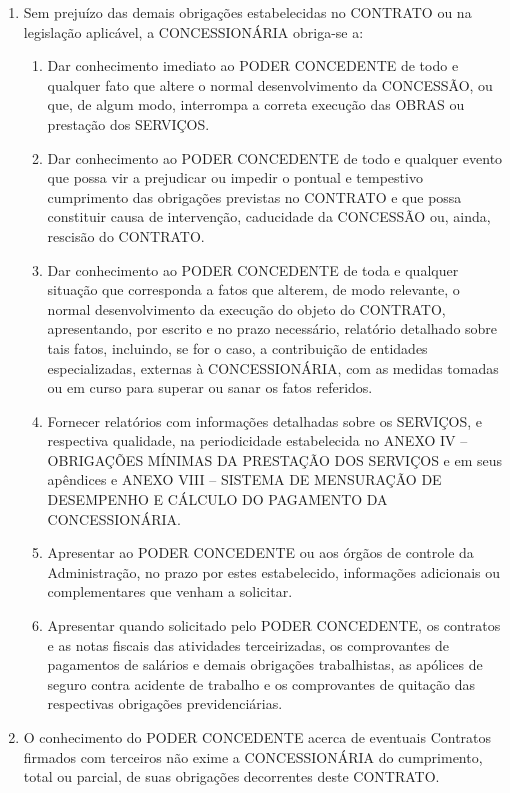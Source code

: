 \documentclass[a4paper,11pt]{report} %
\begin{document}
\begin{enumerate}
\item \label{itm:ZPKX} Sem prejuízo das demais obrigações estabelecidas no CONTRATO ou na legislação aplicável, a CONCESSIONÁRIA obriga-se a:

\begin{enumerate}[label*=\arabic*.]
\item \label{itm:F82B} Dar conhecimento imediato ao PODER CONCEDENTE de todo e qualquer fato que altere o normal desenvolvimento da CONCESSÃO, ou que, de algum modo, interrompa a correta execução das OBRAS ou prestação dos SERVIÇOS.

\item \label{itm:YED7} Dar conhecimento ao PODER CONCEDENTE de todo e qualquer evento que possa vir a prejudicar ou impedir o pontual e tempestivo cumprimento das obrigações previstas no CONTRATO e que possa constituir causa de intervenção, caducidade da CONCESSÃO ou, ainda, rescisão do CONTRATO.

\item \label{itm:N6YS} Dar conhecimento ao PODER CONCEDENTE de toda e qualquer situação que corresponda a fatos que alterem, de modo relevante, o normal desenvolvimento da execução do objeto do CONTRATO, apresentando, por escrito e no prazo necessário, relatório detalhado sobre tais fatos, incluindo, se for o caso, a contribuição de entidades especializadas, externas à CONCESSIONÁRIA, com as medidas tomadas ou em curso para superar ou sanar os fatos referidos.

\item \label{itm:WXDH} Fornecer relatórios com informações detalhadas sobre os SERVIÇOS, e respectiva qualidade, na periodicidade estabelecida no ANEXO IV – OBRIGAÇÕES MÍNIMAS DA PRESTAÇÃO DOS SERVIÇOS e em seus apêndices e ANEXO VIII – SISTEMA DE MENSURAÇÃO DE DESEMPENHO E CÁLCULO DO PAGAMENTO DA CONCESSIONÁRIA.

\item \label{itm:F4PU} Apresentar ao PODER CONCEDENTE ou aos órgãos de controle da Administração, no prazo por estes estabelecido, informações adicionais ou complementares que venham a solicitar.

\item \label{itm:9EP6} Apresentar quando solicitado pelo PODER CONCEDENTE, os contratos e as notas fiscais das atividades terceirizadas, os comprovantes de pagamentos de salários e demais obrigações trabalhistas, as apólices de seguro contra acidente de trabalho e os comprovantes de quitação das respectivas obrigações previdenciárias.
\end{enumerate}

\item \label{itm:JGBH} O conhecimento do PODER CONCEDENTE acerca de eventuais Contratos firmados com terceiros não exime a CONCESSIONÁRIA do cumprimento, total ou parcial, de suas obrigações decorrentes deste CONTRATO.

\end{enumerate}
\end{document}
